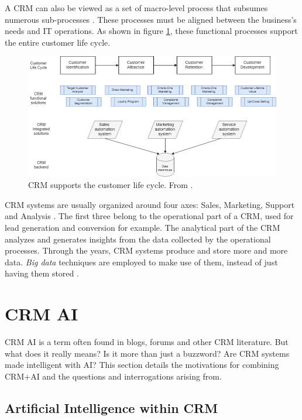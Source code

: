 A CRM can also be viewed as a set of macro-level process that subsumes numerous sub-processes \cite{crm-processes}. These processes must be aligned between the business's needs and IT operations. As shown in figure \ref{fig:crm-clc}, these functional processes support the entire customer life cycle.

\begin{figure}[h]
    \centering
    \includegraphics[width=12cm]{images/CRM-CustomerLifeCycle.png}
    \caption[CRM supports the customer life cycle]{CRM supports the customer life cycle. From \cite{DataAnalyticsinCRMProcessesALiteratureReview}.}
    \label{fig:crm-clc}
\end{figure}

CRM systems are usually organized around four axes: Sales, Marketing, Support and Analysis \cite{crm-def}. The first three belong to the operational part of a CRM, used for lead generation and conversion for example. The analytical part of the CRM analyzes and generates insights from the data collected by the operational processes. Through the years, CRM systems produce and store more and more data. \textit{Big data} techniques are employed to make use of them, instead of just having them stored \cite{peel-et-al}.


\section{CRM AI}

CRM AI is a term often found in blogs, forums and other CRM literature. But what does it really means? Is it more than just a buzzword? Are CRM systems made intelligent with AI? This section details the motivations for combining CRM+AI and the questions and interrogations arising from.

\subsection{Artificial Intelligence within CRM}

